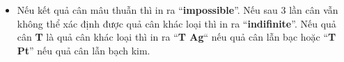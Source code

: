 \begin{itemize}
	\item Nếu kết quả cân mâu thuẫn thì in ra “\textbf{impossible}”. Nếu sau 3 lần cân vẫn không thể xác định được quả cân khác loại thì in ra “\textbf{indifinite}”. Nếu quả cân \textbf{T} là quả cân khác loại thì in ra “\textbf{T Ag}“ nếu quả cân lẫn bạc hoặc “\textbf{T Pt}” nếu quả cân lẫn bạch kim.
\end{itemize}